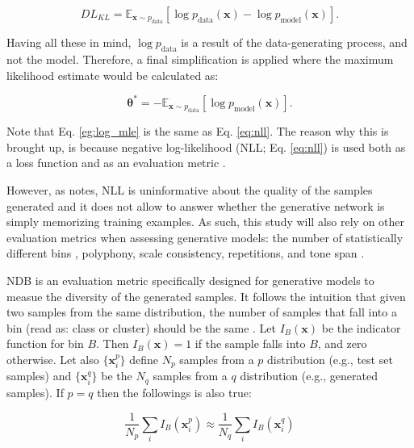 \documentclass[a4paper]{book}
\begin{document}
\begin{equation}
    DL_{KL} = \mathbb{E}_{\mathbf{x} \sim p_{\text{data}}} [\log p_{\text{data}} (\bm{x}) - \log p_{\text{model}} (\bm{x})] \label{eq:kl_div}.
\end{equation}

Having all these in mind, $\log p_{\text{data}}$ is a result of the data-generating process, and not the model. Therefore, a final simplification is applied where the maximum likelihood estimate would be calculated as:

\begin{equation}
    \bm{\theta^*} = - \mathbb{E}_{\mathbf{x} \sim p_{\text{data}}} [\log p_{\text{model}} (\bm{x})] \label{eq:nll}.
\end{equation}

Note that Eq. \ref{eg:log_mle} is the same as Eq. \ref{eq:nll}. The reason why this is brought up, is because negative log-likelihood (NLL; Eq. \ref{eq:nll}) is used both as a loss function and as an evaluation metric \parencite[also for generative models;][]{yu_seqgan_2016, borji_pros_2018}.

However, as \textcite{borji_pros_2018} notes, NLL is uninformative about the quality of the samples generated and it does not allow to answer whether the generative network is simply memorizing training examples. As such, this study will also rely on other evaluation metrics when assessing generative models: the number of statistically different bins \parencite[NDB;][]{richardson_gans_2018}, polyphony, scale consistency, repetitions, and tone span \parencite{mogren_c-rnn-gan_2016}.

NDB is an evaluation metric specifically designed for generative models to measue the diversity of the generated samples. It follows the intuition that given two samples from the same distribution, the number of samples that fall into a bin (read as: class or cluster) should be the same \parencite{richardson_gans_2018}. Let $I_B(\mathbf{x})$ be the indicator function for bin $B$. Then $I_B(\mathbf{x}) = 1$ if the sample falls into $B$, and zero otherwise. Let also $\{\mathbf{x}_i^p\}$ define $N_p$ samples from a $p$ distribution (e.g., test set samples) and $\{\mathbf{x}_i^q\}$ be the $N_q$ samples from a $q$ distribution (e.g., generated samples). If $p = q$ then the followings is also true:

\begin{equation}
    \frac{1}{N_p} \sum_i I_B(\mathbf{x}_i^p) \approx \frac{1}{N_q} \sum_i I_B(\mathbf{x}_i^q)
\end{equation}
\end{document}
